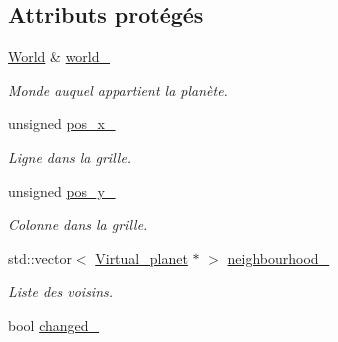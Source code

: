 \subsection*{Attributs protégés}
\begin{DoxyCompactItemize}
\item 
\hypertarget{classVirtual__planet_a16ff82fac346eec9d2229fb8c09e3807}{\hyperlink{classWorld}{World} \& \hyperlink{classVirtual__planet_a16ff82fac346eec9d2229fb8c09e3807}{world\-\_\-}}\label{classVirtual__planet_a16ff82fac346eec9d2229fb8c09e3807}

\begin{DoxyCompactList}\small\item\em Monde auquel appartient la planète. \end{DoxyCompactList}\item 
\hypertarget{classVirtual__planet_ad03593bd1a1236933b638f6079f639b1}{unsigned \hyperlink{classVirtual__planet_ad03593bd1a1236933b638f6079f639b1}{pos\-\_\-x\-\_\-}}\label{classVirtual__planet_ad03593bd1a1236933b638f6079f639b1}

\begin{DoxyCompactList}\small\item\em Ligne dans la grille. \end{DoxyCompactList}\item 
\hypertarget{classVirtual__planet_aa7e03c8010b64d2528d5edb5651962a9}{unsigned \hyperlink{classVirtual__planet_aa7e03c8010b64d2528d5edb5651962a9}{pos\-\_\-y\-\_\-}}\label{classVirtual__planet_aa7e03c8010b64d2528d5edb5651962a9}

\begin{DoxyCompactList}\small\item\em Colonne dans la grille. \end{DoxyCompactList}\item 
\hypertarget{classVirtual__planet_a353b64093f5c146de64a2f694738b65b}{std\-::vector$<$ \hyperlink{classVirtual__planet}{Virtual\-\_\-planet} $\ast$ $>$ \hyperlink{classVirtual__planet_a353b64093f5c146de64a2f694738b65b}{neighbourhood\-\_\-}}\label{classVirtual__planet_a353b64093f5c146de64a2f694738b65b}

\begin{DoxyCompactList}\small\item\em Liste des voisins. \end{DoxyCompactList}\item 
\hypertarget{classVirtual__planet_aa5ebb40e5a4ed0a631b120749f938f35}{bool \hyperlink{classVirtual__planet_aa5ebb40e5a4ed0a631b120749f938f35}{changed\-\_\-}}\label{classVirtual__planet_aa5ebb40e5a4ed0a631b120749f938f35}


\end{DoxyCompactItemize}
